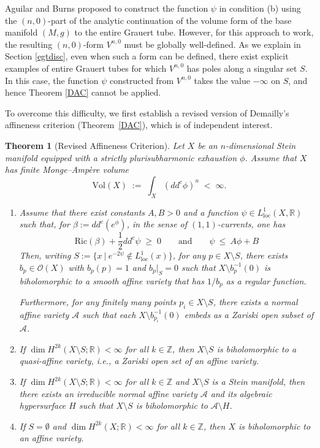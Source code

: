 \documentclass[a4paper, 12pt]{article}
\newcommand{\cA}{\mathcal{A}}
\newcommand{\Vol}{\mathrm{Vol}}
\newcommand{\Ric}{\mathrm{Ric}}
\newcommand{\loc}{\mathrm{loc}}
\newtheorem{thm}{Theorem}[section]
\begin{document}
Aguilar and Burns proposed to construct the function $\psi$ in condition (b) using the $(n,0)$-part of the analytic continuation of the volume form of the base manifold $(M,g)$ to the entire Grauert tube. However, for this approach to work, the resulting $(n,0)$-form $V^{n,0}$ must be globally well-defined. As we explain in Section \ref{egtdisc}, even when such a form can be defined, there exist explicit examples of entire Grauert tubes for which $V^{n,0}$ has poles along a singular set $S$. In this case, the function $\psi$ constructed from $V^{n,0}$ takes the value $-\infty$ on $S$, and hence Theorem \ref{DAC} cannot be applied.

To overcome this difficulty, we first establish a revised version of Demailly's affineness criterion (Theorem~\ref{DAC}), which is of independent interest.

\begin{thm}[Revised Affineness Criterion]\label{main}
Let $X$ be an $n$-dimensional Stein manifold equipped with a strictly plurisubharmonic exhaustion $\phi$.
Assume that $X$ has finite Monge--Amp\`ere volume
\[
\Vol(X)\;:=\;\int_X (dd^c\phi)^n \;<\;\infty.
\]
\begin{enumerate}
\item[(i)] Assume that there exist constants $A,B>0$ and a function $\psi\in L^1_\loc(X,\mathbb{R})$ such that, for $\beta:= dd^c(e^\phi)$, in the sense of $(1,1)$-currents, one has
\[
\Ric(\beta)+\frac{1}{2}dd^c\psi \;\ge\; 0 \qquad \text{and} \qquad \psi~\le~A\phi+B
\]
Then, writing $S:=\{x~|~e^{-2\psi}\notin L^1_\loc(x)\}$, for any $p\in X\setminus S$, there exists $b_p\in\mathcal{O}(X)$ with
$b_p(p)=1$ and $b_p|_S=0$ such that $X\setminus b_p^{-1}(0)$ is biholomorphic to a smooth affine variety that has $1/b_p$ as a regular function.

Furthermore, for any finitely many points $p_i\in X\setminus S$, there exists a normal affine variety $\cA$ such that each $X\setminus b_{p_i}^{-1}(0)$ embeds as a Zariski open subset of $\cA$.

\item[(ii)] If $\dim H^{2k}(X\setminus S;\mathbb{R})<\infty$ for all $k\in\mathbb{Z}$, then $X\setminus S$ is biholomorphic to a quasi-affine variety, i.e., a Zariski open set of an affine variety.

\item[(iii)] If $\dim H^{2k}(X\setminus S;\mathbb{R})<\infty$ for all $k\in\mathbb{Z}$ and $X\setminus S$ is a Stein manifold, then there exists an irreducible normal affine variety $\cA$ and its algebraic hypersurface $H$ such that $X\setminus S$ is biholomorphic to $\cA\setminus H$.

\item[(iv)] If $S=\emptyset$ and $\dim H^{2k}(X;\mathbb{R})<\infty$ for all $k\in\mathbb{Z}$, then $X$ is biholomorphic to an affine variety.
\end{enumerate}
\end{thm}
\end{document}
